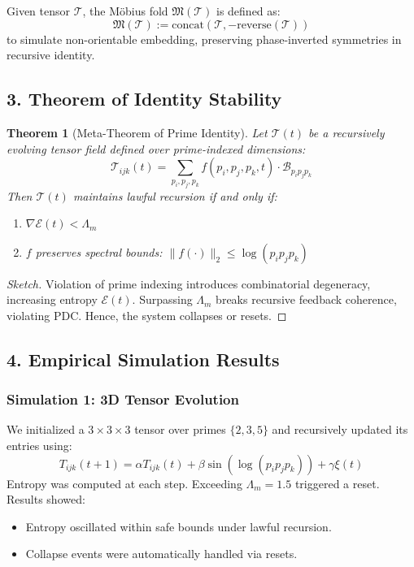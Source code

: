 \documentclass{article}
\theoremstyle{plain}
\newtheorem{theorem}{Theorem}
\begin{document}
\begin{definition}
Given tensor $\mathcal{T}$, the Möbius fold $\mathfrak{M}(\mathcal{T})$ is defined as:
\[
\mathfrak{M}(\mathcal{T}) := \text{concat}(\mathcal{T}, -\text{reverse}(\mathcal{T}))
\]
to simulate non-orientable embedding, preserving phase-inverted symmetries in recursive identity.
\end{definition}

\subsection{3. Theorem of Identity Stability}

\begin{theorem}[Meta-Theorem of Prime Identity]
Let $\mathcal{T}(t)$ be a recursively evolving tensor field defined over prime-indexed dimensions:
\[
\mathcal{T}_{ijk}(t) = \sum_{p_i, p_j, p_k} f(p_i, p_j, p_k, t) \cdot \mathcal{B}_{p_i p_j p_k}
\]
Then $\mathcal{T}(t)$ maintains lawful recursion if and only if:
\begin{enumerate}
    \item $\nabla \mathcal{E}(t) < \Lambda_m$
    \item $f$ preserves spectral bounds: $\|f(\cdot)\|_2 \leq \log(p_i p_j p_k)$
\end{enumerate}
\end{theorem}

\begin{proof}[Sketch]
Violation of prime indexing introduces combinatorial degeneracy, increasing entropy $\mathcal{E}(t)$. Surpassing $\Lambda_m$ breaks recursive feedback coherence, violating PDC. Hence, the system collapses or resets.
\end{proof}

\subsection{4. Empirical Simulation Results}

\subsubsection*{Simulation 1: 3D Tensor Evolution}
We initialized a $3 \times 3 \times 3$ tensor over primes $\{2, 3, 5\}$ and recursively updated its entries using:
\[
T_{ijk}(t+1) = \alpha T_{ijk}(t) + \beta \sin(\log(p_i p_j p_k)) + \gamma \xi(t)
\]
Entropy was computed at each step. Exceeding $\Lambda_m = 1.5$ triggered a reset. Results showed:
\begin{itemize}
    \item Entropy oscillated within safe bounds under lawful recursion.
    \item Collapse events were automatically handled via resets.
\end{itemize}
\end{document}
